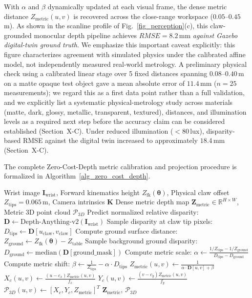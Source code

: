 \documentclass[journal]{IEEEtran}
\begin{document}
With $\alpha$ and $\beta$ dynamically updated at each visual frame, the dense metric distance $Z_{\text{metric}}(u, v)$ is recovered across the close-range workspace ($0.05\text{--}0.45$\,m). As shown in the scanline profile of Fig.~\ref{fig_perception}(c), this claw-grounded monocular depth pipeline achieves $RMSE = 8.2$\,mm \emph{against Gazebo digital-twin ground truth}. We emphasize this important caveat explicitly: this figure characterizes agreement with simulated physics under the calibrated affine model, not independently measured real-world metrology. A preliminary physical check using a calibrated linear stage over 5 fixed distances spanning $0.08$--$0.40$\,m on a matte opaque test object gave a mean absolute error of $11.4$\,mm ($n=25$ measurements); we regard this as a first data point rather than a full validation, and we explicitly list a systematic physical-metrology study across materials (matte, dark, glossy, metallic, transparent, textured), distances, and illumination levels as a required next step before the accuracy claim can be considered established (Section~X-C). Under reduced illumination ($<80$\,lux), disparity-based RMSE against the digital twin increased to approximately $18.4$\,mm (Section~X-C).

The complete Zero-Cost-Depth metric calibration and projection procedure is formalized in Algorithm~\ref{alg_zero_cost_depth}.

\begin{algorithm}[!t]
\caption{Self-Grounded Monocular Depth Metric Calibration and 3D Projection}
\label{alg_zero_cost_depth}
\begin{algorithmic}[1]
\REQUIRE Wrist image $\mathbf{I}_{\text{wrist}}$, Forward kinematics height $Z_{\text{fk}}(\boldsymbol{\theta})$, Physical claw offset $Z_{\text{tips}} = 0.065$\,m, Camera intrinsics $\mathbf{K}$
\ENSURE Dense metric depth map $\mathbf{Z}_{\text{metric}} \in \mathbb{R}^{H \times W}$, Metric 3D point cloud $\mathcal{P}_{3D}$
\STATE Predict normalized relative disparity: $\mathbf{D} \leftarrow \text{Depth-Anything-v2}(\mathbf{I}_{\text{wrist}})$
\STATE Sample disparity at claw tip pixels: $D_{\text{tips}} \leftarrow \mathbf{D}[u_{\text{claw}}, v_{\text{claw}}]$
\STATE Compute ground surface distance: $Z_{\text{ground}} \leftarrow Z_{\text{fk}}(\boldsymbol{\theta}) - Z_{\text{table}}$
\STATE Sample background ground disparity: $D_{\text{ground}} \leftarrow \text{median}(\mathbf{D}[\text{ground\_mask}])$
\STATE Compute metric scale: $\alpha \leftarrow \frac{1/Z_{\text{tips}} - 1/Z_{\text{ground}}}{D_{\text{tips}} - D_{\text{ground}}}$
\STATE Compute metric shift: $\beta \leftarrow \frac{1}{Z_{\text{tips}}} - \alpha \cdot D_{\text{tips}}$
    \STATE $Z_{\text{metric}}(u, v) \leftarrow \frac{1}{\alpha \cdot \mathbf{D}[u, v] + \beta}$
    \STATE $X_c(u, v) \leftarrow \frac{(u - c_x) Z_{\text{metric}}(u, v)}{f_x}$
    \STATE $Y_c(u, v) \leftarrow \frac{(v - c_y) Z_{\text{metric}}(u, v)}{f_y}$
    \STATE $\mathcal{P}_{3D}(u, v) \leftarrow [X_c, Y_c, Z_{\text{metric}}]^T$
\ENDFOR
\RETURN $\mathbf{Z}_{\text{metric}}$, $\mathcal{P}_{3D}$
\end{algorithmic}
\end{algorithm}
\end{document}

